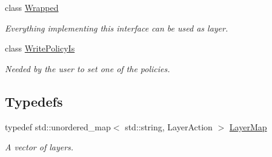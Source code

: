 \begin{DoxyCompactItemize}
class \mbox{\hyperlink{classkdb_1_1Wrapped}{Wrapped}}
\begin{DoxyCompactList}\small\item\em Everything implementing this interface can be used as layer. \end{DoxyCompactList}\item 
class \mbox{\hyperlink{classkdb_1_1WritePolicyIs}{Write\+Policy\+Is}}
\begin{DoxyCompactList}\small\item\em Needed by the user to set one of the policies. \end{DoxyCompactList}\end{DoxyCompactItemize}
\subsection*{Typedefs}
\begin{DoxyCompactItemize}
\item 
\mbox{\label{namespacekdb_ac389d72a0c7be0c026628870f81148fe}} 
typedef std\+::unordered\+\_\+map$<$ std\+::string, Layer\+Action $>$ \mbox{\hyperlink{namespacekdb_ac389d72a0c7be0c026628870f81148fe}{Layer\+Map}}
\begin{DoxyCompactList}\small\item\em A vector of layers. \end{DoxyCompactList}\end{DoxyCompactItemize}
